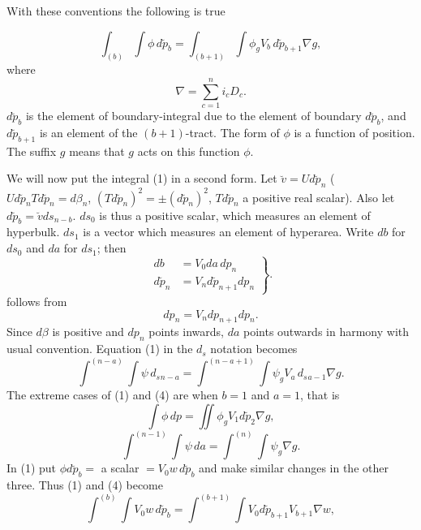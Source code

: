 \documentclass[11pt]{article}
\begin{document}
\begingroup\normalsize

With these conventions the following is true

\begin{equation}\int_{(b)}\!\int \phi\,d\breve p_b=\int_{(b+1)}\!\int \phi_gV_b\,d\breve p_{b+1}\nabla g,\tag{1}\end{equation}
where
\begin{equation}\nabla=\sum_{c=1}^ni_cD_c.\tag{2}\end{equation}
$d\breve p_b$ is the element of boundary-integral due to the element of boundary $d\breve p_b$, and $d\breve p_{b+1}$ is an element of the $(b+1)$-tract. The form of $\phi$ is a function of position. The suffix $g$ means that $g$ acts on this function $\phi$.

\indent We will now put the integral (1) in a second form. Let $\breve v=U d\breve p_n$ ($U d\breve p_nT d\breve p_n=d\beta_n$, $(T d\breve p_n)^2=\pm(d\breve p_n)^2$, $T d\breve p_n$ a positive real scalar). Also let $d\breve p_b=\breve vds_{n-b}$. $ds_0$ is thus a positive scalar, which measures an element of hyperbulk. $ds_1$ is a vector which measures an element of hyperarea. Write $db$ for $ds_0$ and $da$ for $ds_1$; then
\begin{equation}\left.\begin{aligned}db&=V_0da\,dp_n\\d\breve p_n&=V_nd\breve p_{n+1}dp_n\end{aligned}\right\}.\tag{3}\end{equation}
follows from
\[dp_n=V_ndp_{n+1}dp_n.\]
Since $d\beta$ is positive and $dp_n$ points inwards, $da$ points outwards in harmony with usual convention. Equation (1) in the $d_s$ notation becomes
\begin{equation}\int^{(n-a)}\!\int\psi\,d_s{}_{n-a}=\int^{(n-a+1)}\!\int\psi_gV_a\,d_s{}_{a-1}\nabla g.\tag{4}\end{equation}
The extreme cases of (1) and (4) are when $b=1$ and $a=1$, that is
\begin{equation}\int\phi\,dp=\iint\phi_gV_1d\breve p_2\nabla g,\tag{5}\end{equation}
\begin{equation}\int^{(n-1)}\!\int\psi\,da=\int^{(n)}\!\int\psi_g\nabla g.\tag{6}\end{equation}
In (1) put $\phi d\breve p_b=$ a scalar $=V_0w\,d\breve p_b$ and make similar changes in the other three. Thus (1) and (4) become
\begin{equation}\int^{(b)}\!\int V_0w\,d\breve p_b=\int^{(b+1)}\!\int V_0d\breve p_{b+1}V_{b+1}\nabla w,\tag{7}\end{equation}
\end{document}
